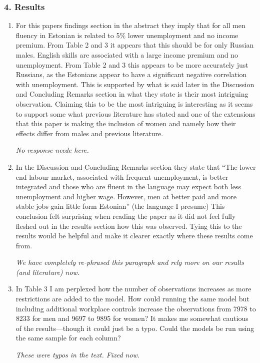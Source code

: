 \documentclass{article}
\newenvironment{response}
{\slshape}{}
\begin{document}
\subsubsection*{4. Results}

\begin{enumerate}
\item For this papers findings section in the abstract they imply that
  for all men fluency in Estonian is related to 5\% lower unemployment
  and no income premium.  From Table 2 and 3 it appears that this
  should be for only Russian males. English skills are associated with
  a large income premium and no unemployment. From Table 2 and 3 this
  appears to be more accurately just Russians, as the Estonians appear
  to have a significant negative correlation with unemployment.  This
  is supported by what is said later in the Discussion and Concluding
  Remarks section in what they state is their most intriguing
  observation.  Claiming this to be the most intriguing is interesting
  as it seems to support some what previous literature has stated and
  one of the extensions that this paper is making the inclusion of
  women and namely how their effects differ from males and previous
  literature. 

  \begin{response}
    No response neede here.
  \end{response}

\item In the Discussion and Concluding Remarks section they state that
  “The lower end labour market, associated with frequent unemployment,
  is better integrated and those who are fluent in the language may
  expect both less unemployment and higher wage. However, men at
  better paid and more stable jobs gain little form Estonian” (the
  language I presume) This conclusion felt surprising when reading the
  paper as it did not feel fully fleshed out in the results section
  how this was observed. Tying this to the results would be helpful
  and make it clearer exactly where these results come from.

  \begin{response}
    We have completely re-phrased this paragraph and rely more on our
    results (and literature) now.
  \end{response}

\item In Table 3 I am perplexed how the number of observations increases as more restrictions are added to the model. How could running the same model but including additional workplace controls increase the observations from 7978 to 8233 for men and 9697 to 9895 for women? It makes me somewhat cautious of the results—though it could just be a typo. Could the models be run using the same sample for each column?

  \begin{response}
    These were typos in the text.  Fixed now.
  \end{response}

\end{enumerate}
\end{document}
